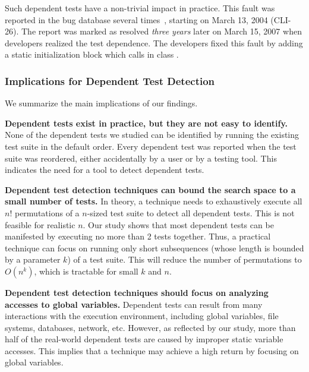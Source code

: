 
Such dependent tests have a non-trivial impact in practice.
This fault was reported in the bug database several times~\cite{clibug},
starting on March 13, 2004 (CLI-26). The report was marked as resolved
\emph{three years} later on March 15, 2007 when developers
realized the test dependence. The developers fixed this
fault by adding a static initialization block which
calls  in class .



\subsubsection{Implications for Dependent Test Detection}

We summarize the main implications of our findings.

\noindent \textbf{{Dependent tests exist in practice, but
they are not easy to identify.}}
None of the dependent tests we studied can be identified by
running the existing test suite in the default order. 
Every dependent test was reported when the
test suite was reordered, either accidentally by a user or
by a testing tool. This indicates the need
for a tool to detect dependent tests.

\vspace{1mm}
\noindent \textbf{Dependent test detection techniques
can bound the search space to a small number of tests.}
In theory, a technique needs to exhaustively execute
all $n!$ permutations of a $n$-sized
test suite to detect all dependent tests. This is
not feasible for realistic $n$.  Our study shows that
most dependent tests can be manifested by executing
no more than 2 tests together. Thus, a practical technique
can focus on running only short subsequences (whose
length is bounded by a parameter $k$)
of a test suite. This will reduce the number of permutations
to $O(n^k)$, which is tractable for small $k$ and $n$.

\vspace{1mm}
\noindent \textbf{Dependent test detection techniques
should focus on analyzing accesses to global variables.}
Dependent tests can result from many
interactions with the execution environment, including
global variables, file systems, databases, network, etc.
However, as reflected by our study, more than half of the
real-world dependent tests are caused
by improper static variable accesses. This implies that a technique
may achieve a high return by focusing on global variables.


